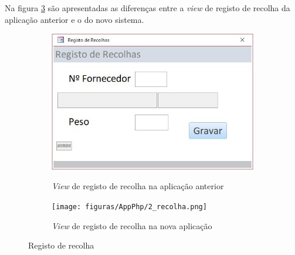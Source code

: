 Na figura \ref{fig:comparacao_recolha} são apresentadas as diferenças entre a \textit{view} de registo de recolha da aplicação anterior e o do novo sistema.
\begin{figure}[H]
	\centering
	
	\begin{subfigure}[t]{0.45\linewidth}
		\includegraphics[width=\linewidth]{figuras/AppAccess/2-Recolha.jpg}
		\label{fig:comparacao_recolha_1}
		\caption{\textit{View} de registo de recolha na aplicação anterior}
	\end{subfigure}
	\begin{subfigure}[t]{0.45\linewidth}
		\texttt{[image: figuras/AppPhp/2\_recolha.png]}
		\label{fig:comparacao_recolha_2}
		\caption{\textit{View} de registo de recolha na nova aplicação}
	\end{subfigure}
	
	\caption{Registo de recolha}
	\label{fig:comparacao_recolha}
\end{figure}

